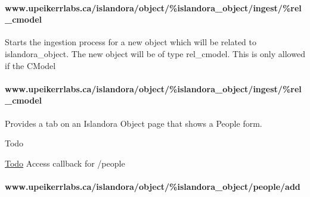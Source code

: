 \paragraph*{www.\+upeikerrlabs.\+ca/islandora/object/\%islandora\+\_\+object/ingest/\%rel\+\_\+cmodel}

Starts the ingestion process for a new object which will be related to islandora\+\_\+object. The new object will be of type rel\+\_\+cmodel. This is only allowed if the C\+Model

\paragraph*{www.\+upeikerrlabs.\+ca/islandora/object/\%islandora\+\_\+object/ingest/\%rel\+\_\+cmodel}

Provides a tab on an Islandora Object page that shows a People form.

\begin{DoxyRefDesc}{Todo}
\item[\hyperlink{todo__todo000003}{Todo}]Access callback for /people \end{DoxyRefDesc}


\paragraph*{www.\+upeikerrlabs.\+ca/islandora/object/\%islandora\+\_\+object/people/add}

